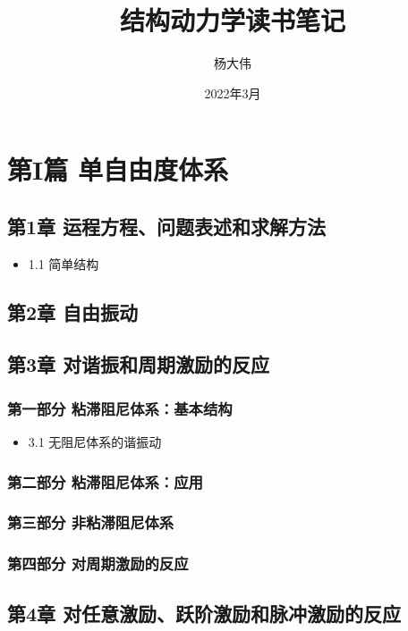 \documentclass[11pt]{article}
\author{杨大伟}
\date{2022年3月}
\title{结构动力学读书笔记}
\begin{document}
\maketitle
\setcounter{tocdepth}{3}
\tableofcontents


\section*{第I篇 单自由度体系}
\label{sec:orgb4de7f6}
\subsection*{第1章 运程方程、问题表述和求解方法}
\label{sec:org63aae9d}
\begin{itemize}
\item 1.1 简单结构
\label{sec:org8836db3}
\end{itemize}
\subsection*{第2章 自由振动}
\label{sec:org2ad68bd}
\subsection*{第3章 对谐振和周期激励的反应}
\label{sec:org48ab687}
\subsubsection*{第一部分 粘滞阻尼体系：基本结构}
\label{sec:orgb96c5c5}
\begin{itemize}
\item 3.1 无阻尼体系的谐振动
\label{sec:orgd73643c}
\end{itemize}
\subsubsection*{第二部分 粘滞阻尼体系：应用}
\label{sec:orgfa5f10c}
\subsubsection*{第三部分 非粘滞阻尼体系}
\label{sec:org1df8ca0}
\subsubsection*{第四部分 对周期激励的反应}
\label{sec:org467a58a}
\subsection*{第4章 对任意激励、跃阶激励和脉冲激励的反应}
\label{sec:orgd941305}
\end{document}
